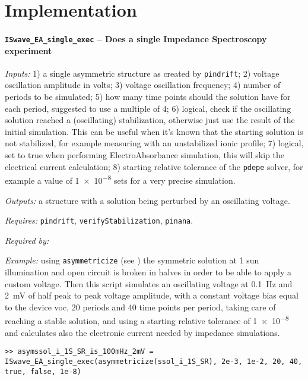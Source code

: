 \section{Implementation}




\paragraph{\texttt{ISwave\_EA\_single\_exec} -- Does a single Impedance Spectroscopy experiment}


\textit{Inputs:} 1) a single asymmetric structure as created by \texttt{pindrift};
2) voltage oscillation amplitude in volts;
3) voltage oscillation frequency;
4) number of periods to be simulated;
5) how many time points should the solution have for
     each period, suggested to use a multiple of 4;
6) logical, check if the oscillating solution reached a
     (oscillating) stabilization, otherwise just use the result of the
     initial simulation. This can be useful when it's known that the
     starting solution is not stabilized, for example measuring with an
     unstabilized ionic profile;
7) logical, set to true when performing ElectroAbsorbance simulation,
     this will skip the electrical current calculation;
8) starting relative tolerance of the \texttt{pdepe} solver, for example a
     value of \num{1e-8} sets for a very precise simulation.

\textit{Outputs:} a structure with a solution being perturbed by an
     oscillating voltage.
     
     \textit{Requires:} \texttt{pindrift}, \texttt{verify\-Stabilization}, \texttt{pinana}.
     
     \textit{Required by:} 
     
   \textit{Example:} using \texttt{asymmetricize} (see ) the symmetric solution at 1 sun illumination and open circuit is broken in halves in order to be able to apply a custom voltage.
   Then this script simulates an oscillating voltage at \SI{0.1}{\Hz} and \SI{2}{\mV} of half peak to peak voltage amplitude, with a constant voltage bias equal to the device \gls{voc},
        20 periods and 40 time points per period, taking care of reaching a stable solution,
        and using a starting relative tolerance of \num{1e-8} and calculates also the electronic current needed by impedance simulations.
   \begin{lstlisting}[style=Matlab-editor]
>> asymssol_i_1S_SR_is_100mHz_2mV = ISwave_EA_single_exec(asymmetricize(ssol_i_1S_SR), 2e-3, 1e-2, 20, 40, true, false, 1e-8)
   \end{lstlisting}
   



